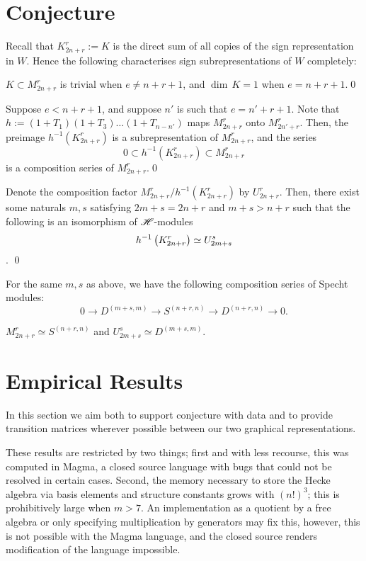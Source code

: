 \documentclass{amsart}
\begin{document}
\section{Conjecture}\label{Conjecture Section}
Recall that $K_{2n + r}^r := K$ is the direct sum of all copies of the sign representation in $W$.
Hence the following characterises sign subrepresentations of $W$ completely:
\begin{proposition}
  $K \subset M_{2n + r}^r$ is trivial when $e \neq n + r + 1$, and $\dim \, K = 1$ when $e = n + r + 1$.\qed
\end{proposition} 
\begin{proposition}
  Suppose $e < n + r + 1$, and suppose $n'$ is such that $e = n' + r + 1$.
  Note that $h := (1 + T_1)(1 + T_3)\dots(1 + T_{n - n'})$ maps $M_{2n + r}^r$ onto $M_{2n' + r}^r$.
  Then, the preimage $h^{-1}(K_{2n + r}^r)$ is a subrepresentation of $M_{2n + r}^r$, and the series
  \[
    0 \subset h^{-1}(K_{2n + r}^r) \subset M_{2n + r}^r
  \]
  is a composition series of $M_{2n + r}^r$.\qed
\end{proposition}
\begin{proposition}
  Denote the composition factor $M_{2n + r}^r / h^{-1}(K_{2n + r}^r)$ by $U_{2n + r}^r$.
  Then, there exist some naturals $m,s$ satisfying $2m + s = 2n + r$ and $m + s > n + r$ such that the following is an isomorphism of $\mathscr{H}$-modules \[h^{-1}\left( K_{2n + r}^r \right) \simeq U_{2m + s}^s\].
  \qed
\end{proposition}
\begin{proposition}
  For the same $m,s$ as above, we have the following composition series of Specht modules:
  \[
    0 \longrightarrow D^{(m+s,m)} \longrightarrow S^{(n+r,n)} \longrightarrow D^{(n+r,n)} \longrightarrow 0.
  \]
\end{proposition}
\begin{proposition}
  $M_{2n + r}^r \simeq S^{(n+r,n)}$ and $U_{2m +s}^s \simeq D^{(m+s,m)}$.
\end{proposition}

\section{Empirical Results}\label{Empirics Section}
In this section we aim both to support conjecture with data and to provide transition matrices wherever possible between our two graphical representations.\cite{Github}

\begin{remark}
  These results are restricted by two things; first and with less recourse, this was computed in Magma, a closed source language with bugs that could not be resolved in certain cases.
  Second, the memory necessary to store the Hecke algebra via basis elements and structure constants grows with $(n!)^3$;
  this is prohibitively large when $m > 7$.
  An implementation as a quotient by a free algebra or only specifying multiplication by generators may fix this, however, this is not possible with the Magma language, and the closed source renders modification of the language impossible.
\end{remark}
\end{document}
